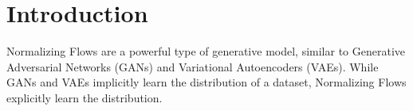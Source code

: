 \section{Introduction}
Normalizing Flows are a powerful type of generative model, similar to Generative
Adversarial Networks (GANs) and Variational Autoencoders (VAEs). While GANs and
VAEs implicitly learn the distribution of a dataset, Normalizing Flows
explicitly learn the distribution.
